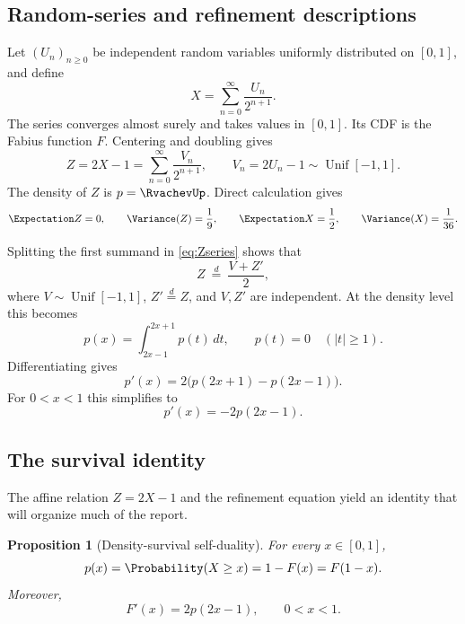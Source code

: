 \documentclass[11pt,oneside]{article}
\newtheorem{proposition}[theorem]{Proposition}
\theoremstyle{definition}
\theoremstyle{remark}
\begin{document}
\subsection{Random-series and refinement descriptions}
Let $(U_n)_{n\ge0}$ be independent random variables uniformly distributed on
$[0,1]$, and define
\begin{equation}\label{eq:Xseries}
 X=\sum_{n=0}^{\infty}\frac{U_n}{2^{n+1}}.
\end{equation}
The series converges almost surely and takes values in $[0,1]$.  Its CDF is the
Fabius function $F$.  Centering and doubling gives
\begin{equation}\label{eq:Zseries}
 Z=2X-1=\sum_{n=0}^{\infty}\frac{V_n}{2^{n+1}},
 \qquad V_n=2U_n-1\sim\operatorname{Unif}[-1,1].
\end{equation}
The density of $Z$ is $p=\RvachevUp$.  Direct calculation gives
\begin{equation}\label{eq:moments-basic}
 \Expectation Z=0,\qquad \Variance(Z)=\frac19,
 \qquad \Expectation X=\frac12,\qquad \Variance(X)=\frac1{36}.
\end{equation}

Splitting the first summand in \eqref{eq:Zseries} shows that
\begin{equation}\label{eq:distributional-recursion}
 Z\ \stackrel{d}=\ \frac{V+Z'}2,
\end{equation}
where $V\sim\operatorname{Unif}[-1,1]$, $Z'\stackrel d=Z$, and $V,Z'$ are
independent.  At the density level this becomes
\begin{equation}\label{eq:refinement}
 p(x)=\int_{2x-1}^{2x+1}p(t)\,dt,
 \qquad p(t)=0\quad(|t|\ge1).
\end{equation}
Differentiating gives
\begin{equation}\label{eq:refinement-derivative}
 p'(x)=2\bigl(p(2x+1)-p(2x-1)\bigr).
\end{equation}
For $0<x<1$ this simplifies to
\begin{equation}\label{eq:positive-derivative}
 p'(x)=-2p(2x-1).
\end{equation}

\subsection{The survival identity}
The affine relation $Z=2X-1$ and the refinement equation yield an identity that
will organize much of the report.

\begin{proposition}[Density-survival self-duality]\label{prop:survival}
For every $x\in[0,1]$,
\begin{equation}\label{eq:survival}
 p(x)=\Probability(X\ge x)=1-F(x)=F(1-x).
\end{equation}
Moreover,
\begin{equation}\label{eq:fabius-density}
 F'(x)=2p(2x-1),\qquad 0<x<1.
\end{equation}
\end{proposition}
\end{document}
